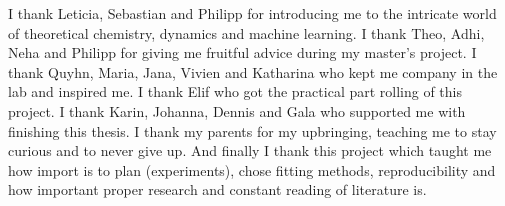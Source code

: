 I thank Leticia, Sebastian and Philipp for introducing me to the intricate world of theoretical chemistry, dynamics and machine learning. 
I thank Theo, Adhi, Neha and Philipp for giving me fruitful advice during my master's project.
I thank Quyhn, Maria, Jana, Vivien and Katharina who kept me company in the lab and inspired me. 
I thank Elif who got the practical part rolling of this project. 
I thank Karin, Johanna, Dennis and Gala who supported me with finishing this thesis. 
I thank my parents for my upbringing, teaching me to stay curious and to never give up.
And finally I thank this project which taught me how import is to plan (experiments), chose fitting methods, reproducibility and how important proper research and constant reading of literature is. 
